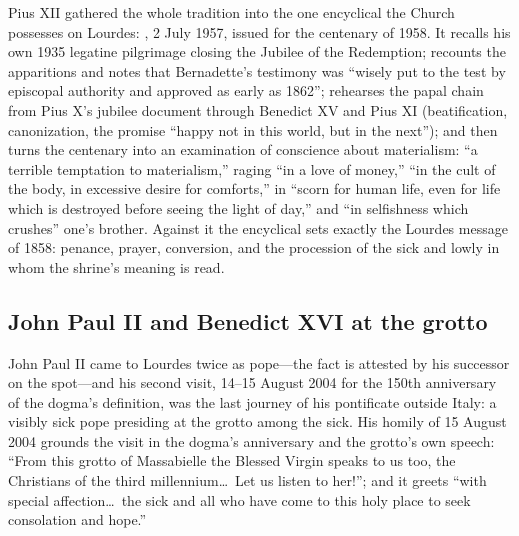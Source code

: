 Pius XII gathered the whole tradition into the one encyclical the
Church possesses on Lourdes: ,
2 July 1957, issued for the centenary of 1958. It recalls his own
1935 legatine pilgrimage closing the Jubilee of the Redemption;
recounts the apparitions and notes that Bernadette's testimony
was ``wisely put to the test by episcopal authority and approved
as early as 1862''; rehearses the papal chain from Pius X's
jubilee document through Benedict XV and Pius XI (beatification,
canonization, the promise ``happy not in this world, but in the
next''); and then turns the centenary into an examination of
conscience about materialism: ``a terrible temptation to
materialism,'' raging ``in a love of money,'' ``in the cult of
the body, in excessive desire for comforts,'' in ``scorn for
human life, even for life which is destroyed before seeing the
light of day,'' and ``in selfishness which crushes'' one's
brother. Against it the encyclical sets exactly the Lourdes
message of 1858: penance, prayer, conversion, and the procession
of the sick and lowly in whom the shrine's meaning is
read.

\subsection{John Paul II and Benedict XVI at the grotto}

John Paul II came to Lourdes twice as pope---the fact is attested
by his successor on the spot---and his second visit, 14--15
August 2004 for the 150th anniversary of the dogma's definition,
was the last journey of his pontificate outside Italy: a visibly
sick pope presiding at the grotto among the sick. His homily of
15 August 2004 grounds the visit in the dogma's anniversary and
the grotto's own speech: ``From this grotto of Massabielle the
Blessed Virgin speaks to us too, the Christians of the third
millennium\ldots\ Let us listen to her!''; and it greets ``with
special affection\ldots\ the sick and all who have come to this
holy place to seek consolation and hope.''

